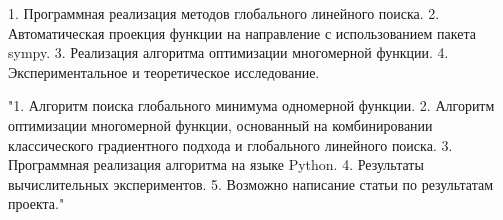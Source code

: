 \documentclass{article}
\begin{document}
    1. Программная реализация методов глобального линейного поиска. 2. Автоматическая проекция функции на направление с использованием пакета sympy. 3. Реализация алгоритма оптимизации многомерной функции. 4. Экспериментальное и теоретическое исследование.


    "1. Алгоритм поиска глобального минимума одномерной функции.
    2. Алгоритм оптимизации многомерной функции, основанный на комбинировании классического градиентного подхода и глобального линейного поиска.
    3. Программная реализация алгоритма на языке Python.
    4. Результаты вычислительных экспериментов.
    5. Возможно написание статьи по результатам проекта."
\end{document}
